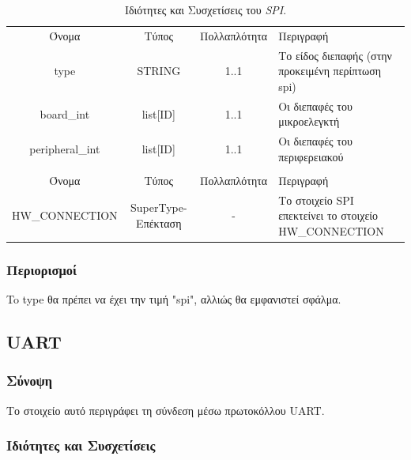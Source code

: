 \begin{table}[H]
	\begin{center}
		\begin{tabular}{ | c | c | c| m{5.5cm} | }
			\hline
			\rowcolor{Gray}
			\multicolumn{4}{|c|}{\textbf{Ιδιότητες}}\\
			\hline
			\rowcolor{Gray}
			Όνομα & Τύπος & Πολλαπλότητα & Περιγραφή \\
			\hline
			type & STRING & 1..1 & Το είδος διεπαφής (στην προκειμένη περίπτωση spi) \\
			\hline
			board\_int & list[ID] & 1..1 & Οι διεπαφές του μικροελεγκτή \\
			\hline
			peripheral\_int & list[ID] & 1..1 & Οι διεπαφές του περιφερειακού \\
			\hline
			\rowcolor{Gray}
			\multicolumn{4}{|c|}{\textbf{Συσχετίσεις}}\\
			\hline
			\rowcolor{Gray}
			Όνομα & Τύπος & Πολλαπλότητα & Περιγραφή \\
			\hline
			\footnotesize{HW\_CONNECTION} & SuperType-Επέκταση & - &  Το στοιχείο SPI επεκτείνει το στοιχείο HW\_CONNECTION \\
			\hline
		\end{tabular}
		\caption{Ιδιότητες και Συσχετίσεις του \textit{SPI}.}
		\label{tab:spi_con}
	\end{center}
\end{table}

\subsubsection*{Περιορισμοί}

\noindent To type θα πρέπει να έχει την τιμή "spi", αλλιώς θα εμφανιστεί σφάλμα.

\subsection{UART}
\label{subsec:uart_con}

\subsubsection*{Σύνοψη}

\noindent Το στοιχείο αυτό περιγράφει τη σύνδεση μέσω πρωτοκόλλου UART.

\subsubsection*{Ιδιότητες και Συσχετίσεις}

